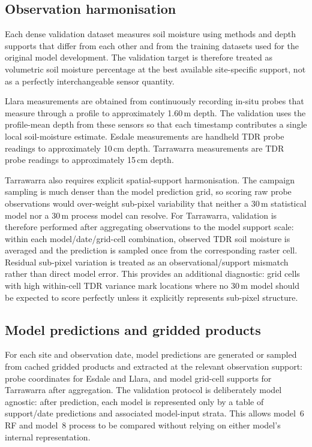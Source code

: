 \documentclass[11pt,a4paper]{article}
\newcommand{\modelSix}{model~6 RF}
\newcommand{\modelEight}{model~8 process}
\begin{document}
\subsection{Observation harmonisation}\label{sec:obs-harmonisation}

Each dense validation dataset measures soil moisture using methods and depth
supports that differ from each other and from the training datasets used for
the original model development.  The validation target is therefore treated as
volumetric soil moisture percentage at the best available site-specific support,
not as a perfectly interchangeable sensor quantity.

Llara measurements are obtained from continuously recording in-situ probes that
measure through a profile to approximately 1.60\,m depth.  The validation uses
the profile-mean depth from these sensors so that each timestamp contributes a
single local soil-moisture estimate.  Esdale measurements are handheld TDR
probe readings to approximately 10\,cm depth.  Tarrawarra measurements are TDR
probe readings to approximately 15\,cm depth.

Tarrawarra also requires explicit spatial-support harmonisation.  The campaign
sampling is much denser than the model prediction grid, so scoring raw
probe observations would over-weight sub-pixel variability that neither a
30\,m statistical model nor a 30\,m process model can resolve.  For Tarrawarra,
validation is therefore performed after aggregating observations to the model
support scale: within each model/date/grid-cell combination, observed TDR soil
moisture is averaged and the prediction is sampled once from the corresponding
raster cell.  Residual sub-pixel variation is treated as an
observational/support mismatch rather than direct model error.  This provides
an additional diagnostic: grid cells with high within-cell TDR variance mark
locations where no 30\,m model should be expected to score perfectly unless it
explicitly represents sub-pixel structure.

\subsection{Model predictions and gridded products}\label{sec:model-products}

For each site and observation date, model predictions are generated or sampled
from cached gridded products and extracted at the relevant observation support:
probe coordinates for Esdale and Llara, and model grid-cell supports for
Tarrawarra after aggregation.
The validation protocol is deliberately model agnostic: after prediction,
each model is represented only by a table of support/date predictions and
associated model-input strata.  This allows \modelSix{} and \modelEight{} to be
compared without relying on either model's internal representation.
\end{document}
